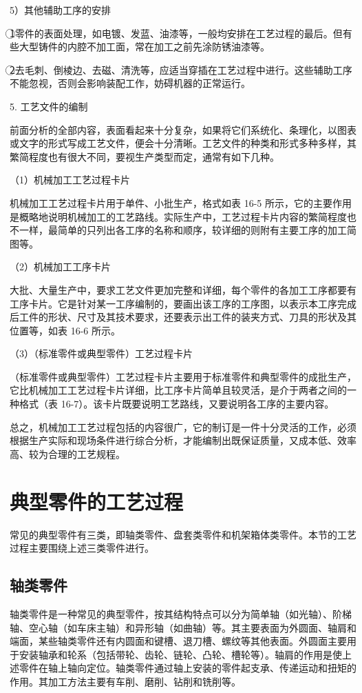 \documentclass[UTF8]{ctexbook}
\newcommand{\◎}{\ensuremath{\bigcirc}}
\begin{document}
5）其他辅助工序的安排

 \textcircled{1}零件的表面处理，如电镀、发蓝、油漆等，一般均安排在工艺过程的最后。但有些大型铸件的内腔不加工面，常在加工之前先涂防锈油漆等。

 \textcircled{2}去毛刺、倒棱边、去磁、清洗等，应适当穿插在工艺过程中进行。这些辅助工序不能忽视，否则会影响装配工作，妨碍机器的正常运行。

5. 工艺文件的编制

前面分析的全部内容，表面看起来十分复杂，如果将它们系统化、条理化，以图表或文字的形式写成工艺文件，便会十分清晰。工艺文件的种类和形式多种多样，其繁简程度也有很大不同，要视生产类型而定，通常有如下几种。

（1）机械加工工艺过程卡片

机械加工工艺过程卡片用于单件、小批生产，格式如表 16-5 所示，它的主要作用是概略地说明机械加工的工艺路线。实际生产中，工艺过程卡片内容的繁简程度也不一样，最简单的只列出各工序的名称和顺序，较详细的则附有主要工序的加工简图等。

（2）机械加工工序卡片

大批、大量生产中，要求工艺文件更加完整和详细，每个零件的各加工工序都要有工序卡片。它是针对某一工序编制的，要画出该工序的工序图，以表示本工序完成后工件的形状、尺寸及其技术要求，还要表示出工件的装夹方式、刀具的形状及其位置等，如表 16-6 所示。

（3）（标准零件或典型零件）工艺过程卡片

（标准零件或典型零件）工艺过程卡片主要用于标准零件和典型零件的成批生产，它比机械加工工艺过程卡片详细，比工序卡片简单且较灵活，是介于两者之间的一种格式（表 16-7）。该卡片既要说明工艺路线，又要说明各工序的主要内容。


总之，机械加工工艺过程包括的内容很广，它的制订是一件十分灵活的工作，必须根据生产实际和现场条件进行综合分析，才能编制出既保证质量，又成本低、效率高、较为合理的工艺规程。

\section{典型零件的工艺过程}
常见的典型零件有三类，即轴类零件、盘套类零件和机架箱体类零件。本节的工艺过程主要围绕上述三类零件进行。

\subsection{轴类零件}
轴类零件是一种常见的典型零件，按其结构特点可以分为简单轴（如光轴）、阶梯轴、空心轴（如车床主轴）和异形轴（如曲轴）等。其主要表面为外圆面、轴肩和端面，某些轴类零件还有内圆面和键槽、退刀槽、螺纹等其他表面。外圆面主要用于安装轴承和轮系（包括带轮、齿轮、链轮、凸轮、槽轮等）。轴肩的作用是使上述零件在轴上轴向定位。轴类零件通过轴上安装的零件起支承、传递运动和扭矩的作用。其加工方法主要有车削、磨削、钻削和铣削等。
\end{document}

